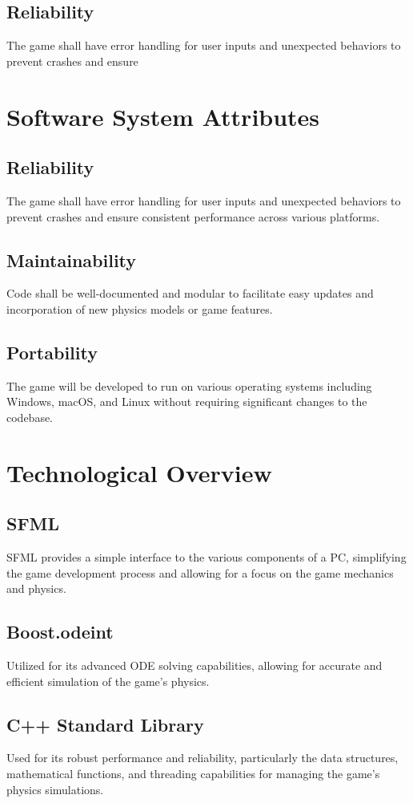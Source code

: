 \documentclass[12pt]{article}
\begin{document}
\subsection{Reliability}
The game shall have error handling for user inputs and unexpected behaviors to prevent crashes and ensure
\section{Software System Attributes}
\subsection{Reliability}
The game shall have error handling for user inputs and unexpected behaviors to prevent crashes and ensure consistent performance across various platforms.

\subsection{Maintainability}
Code shall be well-documented and modular to facilitate easy updates and incorporation of new physics models or game features.

\subsection{Portability}
The game will be developed to run on various operating systems including Windows, macOS, and Linux without requiring significant changes to the codebase.

\section{Technological Overview}
\subsection{SFML}
SFML provides a simple interface to the various components of a PC, simplifying the game development process and allowing for a focus on the game mechanics and physics.

\subsection{Boost.odeint}
Utilized for its advanced ODE solving capabilities, allowing for accurate and efficient simulation of the game's physics.

\subsection{C++ Standard Library}
Used for its robust performance and reliability, particularly the data structures, mathematical functions, and threading capabilities for managing the game's physics simulations.
\end{document}
